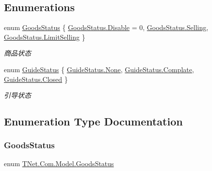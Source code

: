 \subsection*{Enumerations}
\begin{DoxyCompactItemize}
\item 
enum \mbox{\hyperlink{namespace_t_net_1_1_com_1_1_model_a3b1f8ce34eb5886ad9d60ff9f72bc4ce}{Goods\+Status}} \{ \mbox{\hyperlink{namespace_t_net_1_1_com_1_1_model_a3b1f8ce34eb5886ad9d60ff9f72bc4ceabcfaccebf745acfd5e75351095a5394a}{Goods\+Status.\+Disable}} = 0, 
\mbox{\hyperlink{namespace_t_net_1_1_com_1_1_model_a3b1f8ce34eb5886ad9d60ff9f72bc4cea78657bac83c0d4f4d86f22710119667a}{Goods\+Status.\+Selling}}, 
\mbox{\hyperlink{namespace_t_net_1_1_com_1_1_model_a3b1f8ce34eb5886ad9d60ff9f72bc4cea008c874764aac534d1ed46806f3999a2}{Goods\+Status.\+Limit\+Selling}}
 \}
\begin{DoxyCompactList}\small\item\em 商品状态 \end{DoxyCompactList}\item 
enum \mbox{\hyperlink{namespace_t_net_1_1_com_1_1_model_a707db44f1e497fe59e8085ae6892a50d}{Guide\+Status}} \{ \mbox{\hyperlink{namespace_t_net_1_1_com_1_1_model_a707db44f1e497fe59e8085ae6892a50da6adf97f83acf6453d4a6a4b1070f3754}{Guide\+Status.\+None}}, 
\mbox{\hyperlink{namespace_t_net_1_1_com_1_1_model_a707db44f1e497fe59e8085ae6892a50da652cb8947b8ad418372692113835cdc9}{Guide\+Status.\+Complate}}, 
\mbox{\hyperlink{namespace_t_net_1_1_com_1_1_model_a707db44f1e497fe59e8085ae6892a50da03f4a47830f97377a35321051685071e}{Guide\+Status.\+Closed}}
 \}
\begin{DoxyCompactList}\small\item\em 引导状态 \end{DoxyCompactList}\end{DoxyCompactItemize}


\subsection{Enumeration Type Documentation}
\mbox{\label{namespace_t_net_1_1_com_1_1_model_a3b1f8ce34eb5886ad9d60ff9f72bc4ce}} 
\subsubsection{\texorpdfstring{Goods\+Status}{GoodsStatus}}
{\footnotesize\ttfamily enum \mbox{\hyperlink{namespace_t_net_1_1_com_1_1_model_a3b1f8ce34eb5886ad9d60ff9f72bc4ce}{T\+Net.\+Com.\+Model.\+Goods\+Status}}\hspace{0.3cm}{\ttfamily [strong]}}



